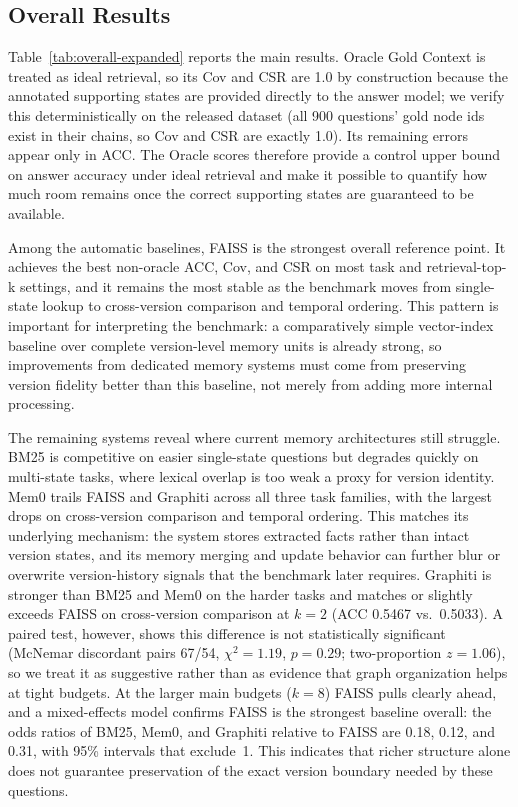 \subsection{Overall Results}





Table~\ref{tab:overall-expanded} reports the main results. Oracle Gold Context is treated as ideal retrieval, so its Cov and CSR are 1.0 by construction because the annotated supporting states are provided directly to the answer model; we verify this deterministically on the released dataset (all 900 questions' gold node ids exist in their chains, so Cov and CSR are exactly 1.0). Its remaining errors appear only in ACC. The Oracle scores therefore provide a control upper bound on answer accuracy under ideal retrieval and make it possible to quantify how much room remains once the correct supporting states are guaranteed to be available.

Among the automatic baselines, FAISS is the strongest overall reference point. It achieves the best non-oracle ACC, Cov, and CSR on most task and retrieval-top-k settings, and it remains the most stable as the benchmark moves from single-state lookup to cross-version comparison and temporal ordering. This pattern is important for interpreting the benchmark: a comparatively simple vector-index baseline over complete version-level memory units is already strong, so improvements from dedicated memory systems must come from preserving version fidelity better than this baseline, not merely from adding more internal processing.

The remaining systems reveal where current memory architectures still struggle. BM25 is competitive on easier single-state questions but degrades quickly on multi-state tasks, where lexical overlap is too weak a proxy for version identity. Mem0 trails FAISS and Graphiti across all three task families, with the largest drops on cross-version comparison and temporal ordering. This matches its underlying mechanism: the system stores extracted facts rather than intact version states, and its memory merging and update behavior can further blur or overwrite version-history signals that the benchmark later requires. Graphiti is stronger than BM25 and Mem0 on the harder tasks and matches or slightly exceeds FAISS on cross-version comparison at $k{=}2$ (ACC 0.5467 vs.\ 0.5033). A paired test, however, shows this difference is not statistically significant (McNemar discordant pairs 67/54, $\chi^2{=}1.19$, $p{=}0.29$; two-proportion $z{=}1.06$), so we treat it as suggestive rather than as evidence that graph organization helps at tight budgets. At the larger main budgets ($k{=}8$) FAISS pulls clearly ahead, and a mixed-effects model confirms FAISS is the strongest baseline overall: the odds ratios of BM25, Mem0, and Graphiti relative to FAISS are 0.18, 0.12, and 0.31, with 95\% intervals that exclude~1. This indicates that richer structure alone does not guarantee preservation of the exact version boundary needed by these questions.

